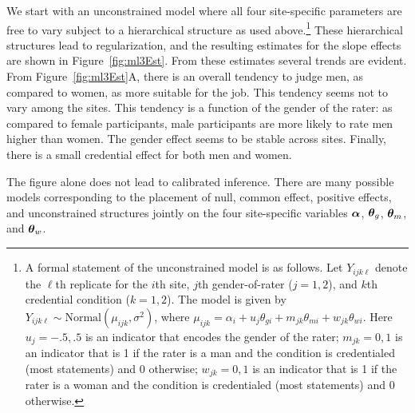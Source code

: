 \documentclass[english,man]{apa6}
\theoremstyle{definition}
\theoremstyle{definition}
\theoremstyle{definition}
\theoremstyle{remark}
\begin{document}
We start with an unconstrained model where all four site-specific
parameters are free to vary subject to a hierarchical structure as used
above.\footnote{A formal statement of the unconstrained model is as
  follows. Let \(Y_{ijk\ell}\) denote the \(\ell\)th replicate for the
  \(i\)th site, \(j\)th gender-of-rater (\(j=1,2\)), and \(k\)th
  credential condition (\(k=1,2\)). The model is given by
  \(Y_{ijk\ell}\sim \mbox{Normal}(\mu_{ijk},\sigma^2)\), where
  \(\mu_{ijk}=\alpha_i +u_j\theta_{gi}+m_{jk}\theta_{mi}+w_{jk}\theta_{wi}\).
  Here \(u_j=-.5,.5\) is an indicator that encodes the gender of the
  rater; \(m_{jk}=0,1\) is an indicator that is 1 if the rater is a man
  and the condition is credentialed (most statements) and 0 otherwise;
  \(w_{jk}=0,1\) is an indicator that is 1 if the rater is a woman and
  the condition is credentialed (most statements) and 0 otherwise.}
These hierarchical structures lead to regularization, and the resulting
estimates for the slope effects are shown in Figure~\ref{fig:ml3Est}.
From these estimates several trends are evident. From
Figure~\ref{fig:ml3Est}A, there is an overall tendency to judge men, as
compared to women, as more suitable for the job. This tendency seems not
to vary among the sites. This tendency is a function of the gender of
the rater: as compared to female participants, male participants are
more likely to rate men higher than women. The gender effect seems to be
stable across sites. Finally, there is a small credential effect for
both men and women.

The figure alone does not lead to calibrated inference. There are many
possible models corresponding to the placement of null, common effect,
positive effects, and unconstrained structures jointly on the four
site-specific variables \(\bm \alpha\), \(\bm \theta_g\), \(\bm \theta_m\),
and \(\bm \theta_w\).
\end{document}
